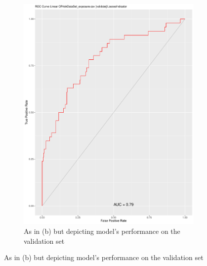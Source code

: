 \documentclass[
]{article}
\begin{document}
\begin{figure}[t!]
\begin{subfigure}{0.48\textwidth}
\includegraphics[width=\linewidth]{BIN_ROC_Validation.pdf}
\caption{As in (b) but depicting model's performance on the validation set} \label{BIN_ROC_Validate}
\end{subfigure}


\end{figure}
\end{document}
